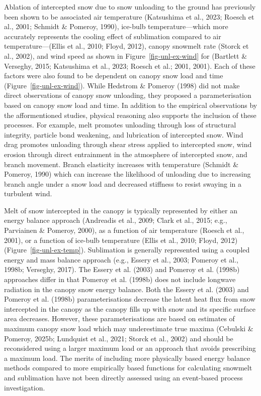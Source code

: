 \documentclass[
]{agujournal2019}
\begin{document}
Ablation of intercepted snow due to snow unloading to the ground has
previously been shown to be associated air temperature (Katsushima et
al., 2023; Roesch et al., 2001; Schmidt \& Pomeroy, 1990), ice-bulb
temperature---which more accurately represents the cooling effect of
sublimation compared to air temperature---(Ellis et al., 2010; Floyd,
2012), canopy snowmelt rate (Storck et al., 2002), and wind speed as
shown in Figure~\ref{fig-unl-ex-wind} for (Bartlett \& Verseghy, 2015;
Katsushima et al., 2023; Roesch et al.; 2001, 2001). Each of these
factors were also found to be dependent on canopy snow load and time
(Figure~\ref{fig-unl-ex-wind}). While Hedstrom \& Pomeroy (1998) did not
make direct observations of canopy snow unloading, they proposed a
parameterisation based on canopy snow load and time. In addition to the
empirical observations by the afformentioned studies, physical reasoning
also supports the inclusion of these processes. For example, melt
promotes unloading through loss of structural integrity, particle bond
weakening, and lubrication of intercepted snow. Wind drag promotes
unloading through shear stress applied to intercepted snow, wind erosion
through direct entrainment in the atmosphere of intercepted snow, and
branch movement. Branch elasticity increases with temperature (Schmidt
\& Pomeroy, 1990) which can increase the likelihood of unloading due to
increasing branch angle under a snow load and decreased stiffness to
resist swaying in a turbulent wind.

Melt of snow intercepted in the canopy is typically represented by
either an energy balance approach (Andreadis et al., 2009; Clark et al.,
2015; e.g., Parviainen \& Pomeroy, 2000), as a function of air
temperature (Roesch et al., 2001), or a function of ice-bulb temperature
(Ellis et al., 2010; Floyd, 2012) (Figure~\ref{fig-unl-ex-temp}).
Sublimation is generally represented using a coupled energy and mass
balance approach (e.g., Essery et al., 2003; Pomeroy et al., 1998b;
Verseghy, 2017). The Essery et al. (2003) and Pomeroy et al. (1998b)
approaches differ in that Pomeroy et al. (1998b) does not include
longwave radiation in the canopy snow energy balance. Both the Essery et
al. (2003) and Pomeroy et al. (1998b) parameterisations decrease the
latent heat flux from snow intercepted in the canopy as the canopy fills
up with snow and its specific surface area decreases. However, these
parameterisations are based on estimates of maximum canopy snow load
which may underestimate true maxima (Cebulski \& Pomeroy, 2025b;
Lundquist et al., 2021; Storck et al., 2002) and should be reconsidered
using a larger maximum load or an approach that avoids prescribing a
maximum load. The merits of including more physically based energy
balance methods compared to more empirically based functions for
calculating snowmelt and sublimation have not been directly assessed
using an event-based process investigation.
\end{document}
